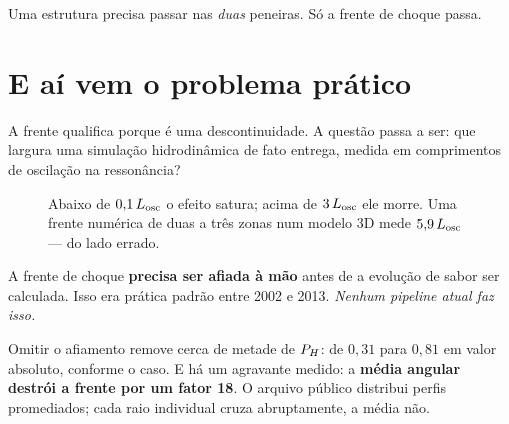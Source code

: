 Uma estrutura precisa passar nas \emph{duas} peneiras. Só a frente de choque
passa.

\section{E aí vem o problema prático}

A frente qualifica porque é uma descontinuidade. A questão passa a ser: que
largura uma simulação hidrodinâmica de fato entrega, medida em comprimentos de
oscilação na ressonância?

\begin{figure}[!htb]
\centering
{}
\caption{Abaixo de $0{,}1\,L_{\text{osc}}$ o efeito satura; acima de $3\,L_{\text{osc}}$ ele
morre. Uma frente numérica de duas a três zonas num modelo 3D mede
$5{,}9\,L_{\text{osc}}$ --- do lado errado.}
\end{figure}

\begin{alerta}
A frente de choque \textbf{precisa ser afiada à mão} antes de a evolução de
sabor ser calculada. Isso era prática padrão entre 2002 e 2013. \emph{Nenhum
pipeline atual faz isso.}

\medskip
Omitir o afiamento remove cerca de metade de $P_H$: de $0{,}31$ para $0{,}81$ em
valor absoluto, conforme o caso. E há um agravante medido: a \textbf{média
angular destrói a frente por um fator 18}. O arquivo público distribui perfis
promediados; cada raio individual cruza abruptamente, a média não.
\end{alerta}

